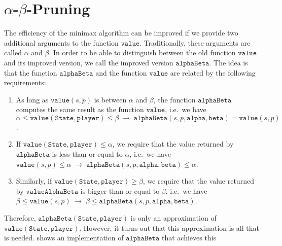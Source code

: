 \section{$\alpha$-$\beta$-Pruning}
The efficiency of the minimax algorithm can be improved if we provide two additional arguments to the function
$\texttt{value}$.  Traditionally, these arguments are called $\alpha$ and $\beta$.  In order to be able to
distinguish between the old function $\texttt{value}$ and its improved version, we call the improved version 
$\texttt{alphaBeta}$.  The idea is that the function $\texttt{alphaBeta}$ and the function $\texttt{value}$ are
related by the following requirements: 
\begin{enumerate}
\item As long as $\texttt{value}(s, p)$ is between $\alpha$ and $\beta$, the function
      $\texttt{alphaBeta}$ computes the same result as the function $\texttt{value}$,
      i.e.~we have
      \\[0.2cm]
      \hspace*{0.3cm}
      $\alpha \leq \texttt{value}(\texttt{State}, \texttt{player}) \leq \beta \;\rightarrow\;
         \texttt{alphaBeta}(s, p, \texttt{alpha}, \texttt{beta}) = \texttt{value}(s,p)
      $.
\item If $\texttt{value}(\texttt{State},\texttt{player}) \leq \alpha$, we require that the value returned by
      $\texttt{alphaBeta}$ is less than or equal to $\alpha$, i.e.~we have 
      \\[0.2cm]
      \hspace*{0.3cm}
      $\texttt{value}(s, p) \leq \alpha \;\rightarrow\;
       \texttt{alphaBeta}(s, p, \texttt{alpha}, \texttt{beta}) \leq \alpha
      $.
\item Similarly, if $\texttt{value}(\texttt{State},\texttt{player}) \geq \beta$, we require that the value
      returned by $\texttt{valueAlphaBeta}$ is bigger than or equal to $\beta$, i.e.~we have 
      \\[0.2cm]
      \hspace*{0.3cm}
      $\beta \leq \texttt{value}(s, p) \;\rightarrow\;
        \beta \leq \texttt{alphaBeta}(s, p, \texttt{alpha}, \texttt{beta}) 
      $.
\end{enumerate}
Therefore, $\texttt{alphaBeta}(\texttt{State}, \texttt{player})$  is only an approximation of
$\texttt{value}(\texttt{State}, \texttt{player})$.  However, it turns out that this approximation is all that
is needed.   shows an implementation of $\texttt{alphaBeta}$ that achieves this
